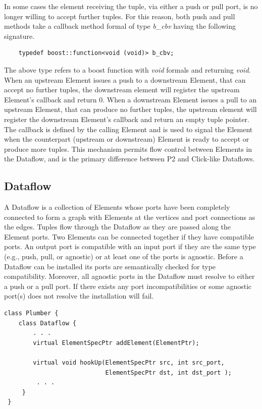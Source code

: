 \documentclass[12pt]{article}
\begin{document}
In some cases the element receiving the tuple, via either a push or pull port, is no
longer willing to accept further tuples. For this reason, both push and pull methods 
take a callback method formal of type \emph{b\_cbv} having the following signature.
\begin{verbatim}
    typedef boost::function<void (void)> b_cbv;
\end{verbatim}
The above type refers to a boost function with \emph{void} formals and returning
\emph{void}. When an upstream Element issues a push to a downstream Element, 
that can accept no further tuples, the downstream element will register the 
upstream Element's callback and return $0$. When a downstream Element issues
a pull to an upstream Element, that can produce no further tuples, the upstream element
will register the downstream Element's callback and return an empty tuple pointer.
The callback is defined by the calling Element and is used to signal
the Element when the counterpart (upstream or downstream) Element is ready to 
accept or produce more tuples. This mechanism permits flow control between 
Elements in the Dataflow, and is the primary difference between P2 and Click-like
Dataflows. 

\subsection{Dataflow}

A Dataflow is a collection of Elements whose ports have been completely connected 
to form a graph with Elements at the vertices and port connections as the edges. 
Tuples flow through the Dataflow as they are passed along the Element ports. 
Two Elements can be connected together if they have compatible ports. An output port is 
compatible with an input port if they are the same type (e.g., push, pull, or agnostic) or
at least one of the ports is agnostic. Before a Dataflow can be installed its ports are
semantically checked for type compatibility. Moreover, all agnostic ports in the 
Dataflow must resolve to either a push or a pull port. If there exists any port 
incompatibilities or some agnostic port(s) does not resolve the installation will fail.

\begin{verbatim}
class Plumber {
    class Dataflow {
        . . .
        virtual ElementSpecPtr addElement(ElementPtr);

        virtual void hookUp(ElementSpecPtr src, int src_port,
                            ElementSpecPtr dst, int dst_port );
         . . .
     }
 }
\end{verbatim}
\end{document}
